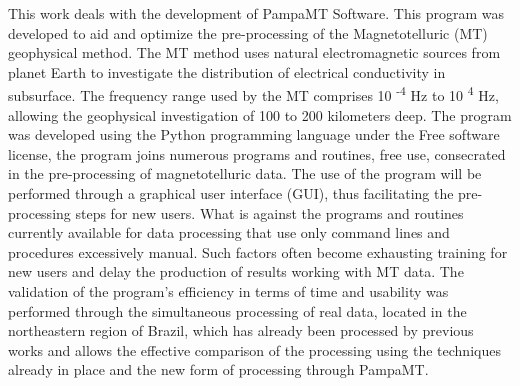 \documentclass[12pt,twoside,oneright,a4paper,chapter=TITLE,english,brazil]{unipampa}
\begin{document}
\begin{resumoingles}
This work deals with the development of PampaMT Software. This program was developed to aid and optimize the pre-processing of the Magnetotelluric (MT) geophysical method. The MT method uses natural electromagnetic sources from planet Earth to investigate the distribution of electrical conductivity in subsurface. The frequency range used by the MT comprises 10 \textsuperscript{-4} Hz to 10 \textsuperscript{4} Hz, allowing the geophysical investigation of 100 to 200 kilometers deep. The program was developed using the Python programming language under the Free software license, the program joins numerous programs and routines, free use, consecrated in the pre-processing of magnetotelluric data. The use of the program will be performed through a graphical user interface (GUI), thus facilitating the pre-processing steps for new users. What is against the programs and routines currently available for data processing that use only command lines and procedures excessively manual. Such factors often become exhausting training for new users and delay the production of results working with MT data. The validation of the program's efficiency in terms of time and usability was performed through the simultaneous processing of real data, located in the northeastern region of Brazil, which has already been processed by previous works and allows the effective comparison of the processing using the techniques already in place and the new form of processing through PampaMT.
\end{resumoingles}
\end{document}

